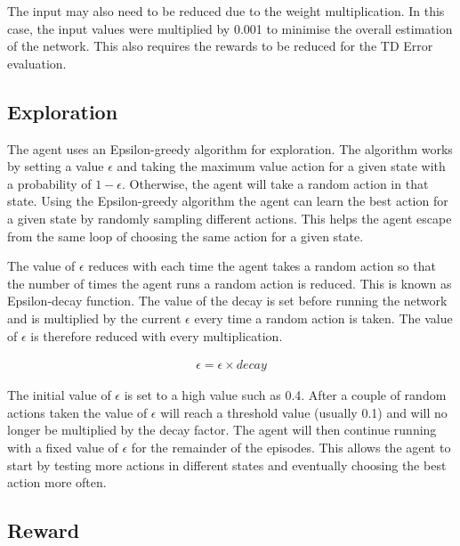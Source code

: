 The input may also need to be reduced due to the weight multiplication. In this
case, the input values were multiplied by 0.001 to minimise the overall
estimation of the network. This also requires the rewards to be reduced for the
TD Error evaluation.

\subsection{Exploration}

The agent uses an Epsilon-greedy algorithm for exploration. The algorithm works
by setting a value $\epsilon$ and taking the maximum value action for a given
state with a probability of $1-\epsilon$. Otherwise, the agent will take a random
action in that state. Using the Epsilon-greedy algorithm the agent can
learn the best action for a given state by randomly sampling different actions.
This helps the agent escape from the same loop of choosing the same action for a
given state.

The value of $\epsilon$ reduces with each time the agent takes a random action
so that the number of times the agent runs a random action is reduced. This is
known as Epsilon-decay function. The value of the decay is set before running
the network and is multiplied by the current $\epsilon$ every time a random
action is taken. The value of $\epsilon$ is therefore reduced with every
multiplication.

\begin{align}
    \epsilon = \epsilon \times decay
\end{align}

The initial value of $\epsilon$ is set to a high value such as 0.4. After a couple
of random actions taken the value of $\epsilon$ will reach a threshold value
(usually 0.1) and will no longer be multiplied by the decay factor. The agent
will then continue running with a fixed value of $\epsilon$ for the remainder of
the episodes. This allows the agent to start by testing more actions in
different states and eventually choosing the best action more often.

\subsection{Reward}

